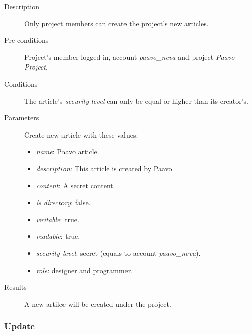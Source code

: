 \begin{description}
\item[Description] Only project members can create the project's new articles.
\item[Pre-conditions] Project's member logged in, \eg account \emph{paavo\_neva} and project \emph{Paavo Project}.
\item[Conditions] The article's \emph{security level} can only be equal or higher than its creator's.
\item[Parameters] Create new article with these values:
\begin{itemize}
\item \emph{name}: Paavo article.
\item \emph{description}: This article is created by Paavo.
\item \emph{content}: A secret content.
\item \emph{is directory}: false.
\item \emph{writable}: true.
\item \emph{readable}: true.
\item \emph{security level}: secret (equals to account \emph{paavo\_neva}).
\item \emph{role}: designer and programmer.
\end{itemize}
\item[Results] A new artilce will be created under the project.
\end{description}

\subsubsection{Update}
\label{ch:result:user_guide:article:update}

